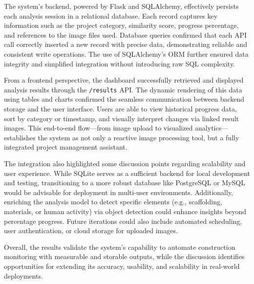 \documentclass[12pt,a4paper]{report}
\begin{document}
The system’s backend, powered by Flask and SQLAlchemy, effectively persists each analysis session in a relational database. Each record captures key information such as the project category, similarity score, progress percentage, and references to the image files used. Database queries confirmed that each API call correctly inserted a new record with precise data, demonstrating reliable and consistent write operations. The use of SQLAlchemy’s ORM further ensured data integrity and simplified integration without introducing raw SQL complexity.

From a frontend perspective, the dashboard successfully retrieved and displayed analysis results through the \texttt{/results} API. The dynamic rendering of this data using tables and charts confirmed the seamless communication between backend storage and the user interface. Users are able to view historical progress data, sort by category or timestamp, and visually interpret changes via linked result images. This end-to-end flow—from image upload to visualized analytics—establishes the system as not only a reactive image processing tool, but a fully integrated project management assistant.

The integration also highlighted some discussion points regarding scalability and user experience. While SQLite serves as a sufficient backend for local development and testing, transitioning to a more robust database like PostgreSQL or MySQL would be advisable for deployment in multi-user environments. Additionally, enriching the analysis model to detect specific elements (e.g., scaffolding, materials, or human activity) via object detection could enhance insights beyond percentage progress. Future iterations could also include automated scheduling, user authentication, or cloud storage for uploaded images.

Overall, the results validate the system’s capability to automate construction monitoring with measurable and storable outputs, while the discussion identifies opportunities for extending its accuracy, usability, and scalability in real-world deployments.
\end{document}
